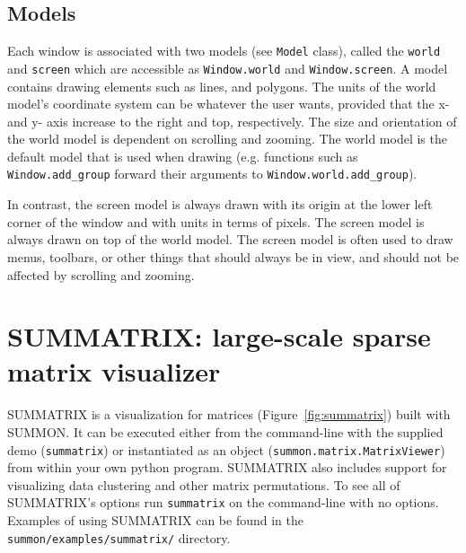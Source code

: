 \documentclass[12pt]{article}
\newcommand{\code}[1]{{\tt #1}}
\newcommand{\figref}[1]{Figure~\ref{#1}}
\begin{document}
\subsection{Models}

Each window is associated with two models (see \code{Model} class), called the
\code{world} and \code{screen} which are accessible as \code{Window.world} and
\code{Window.screen}.  A model contains drawing elements such as lines, and
polygons.  The units of the world model's coordinate system  can
be whatever the user wants, provided that the x- and y- axis increase to 
the right and top, respectively.   The size and orientation of the world 
model is dependent on scrolling and zooming. The world model is the
default model that is  used when drawing (e.g. functions such as
\code{Window.add\_group} forward their arguments to 
\code{Window.world.add\_group}).

In contrast, the screen model is always drawn with its origin at the 
lower left corner of the window and with units in terms of pixels. The
screen model is always drawn on top of the world model.  The screen model
is often used to draw menus, toolbars, or other things that should always
be in view, and should not be affected by scrolling and zooming.



\section{SUMMATRIX: large-scale sparse matrix visualizer}

SUMMATRIX is a visualization for matrices (\figref{fig:summatrix}) built with
SUMMON.  It can be executed either from the command-line with the supplied demo
(\code{summatrix}) or  instantiated as an object
(\code{summon.matrix.MatrixViewer}) from within your own python program. 
SUMMATRIX also includes support for visualizing data clustering and other
matrix permutations.  To see all of SUMMATRIX's options run \code{summatrix} on
the command-line with no options.  Examples of using SUMMATRIX can be found in
the \code{summon/examples/summatrix/} directory.
\end{document}
